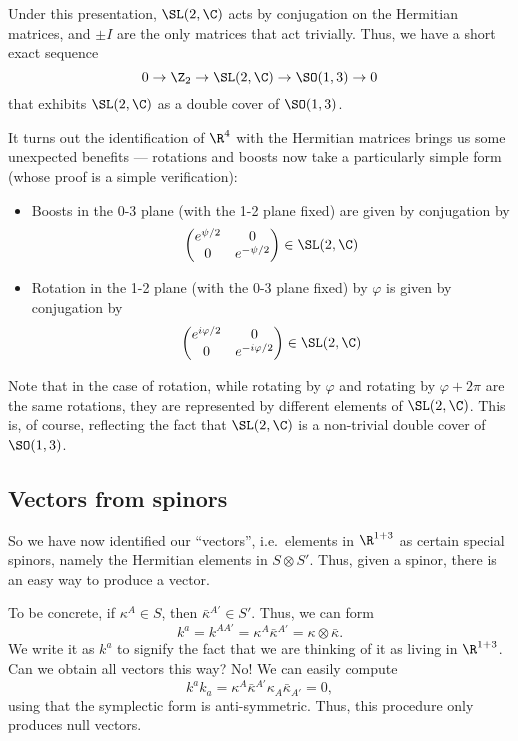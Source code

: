 \documentclass[a4paper]{article}
\begin{document}
Under this presentation, $\SL(2, \C)$ acts by conjugation on the Hermitian matrices, and $\pm I$ are the only matrices that act trivially. Thus, we have a short exact sequence
\[
  0 \to \Z_2 \to \SL(2, \C) \to \SO(1, 3) \to 0
\]
that exhibits $\SL(2, \C)$ as a double cover of $\SO(1, 3)$.

It turns out the identification of $\R^4$ with the Hermitian matrices brings us some unexpected benefits --- rotations and boosts now take a particularly simple form (whose proof is a simple verification):
\begin{prop}\leavevmode
  \begin{itemize}
    \item Boosts in the 0-3 plane (with the 1-2 plane fixed) are given by conjugation by
      \[
        \begin{pmatrix}
          e^{\psi/2} & 0\\
          0 & e^{-\psi/2}
        \end{pmatrix} \in \SL(2, \C)
      \]
    \item Rotation in the 1-2 plane (with the 0-3 plane fixed) by $\varphi$ is given by conjugation by
      \[
        \begin{pmatrix}
          e^{i\varphi/2} & 0\\
          0 & e^{-i\varphi/2}
        \end{pmatrix} \in \SL(2, \C)
      \]
  \end{itemize}
\end{prop}
Note that in the case of rotation, while rotating by $\varphi$ and rotating by $\varphi + 2\pi$ are the same rotations, they are represented by different elements of $\SL(2, \C)$. This is, of course, reflecting the fact that $\SL(2, \C)$ is a non-trivial double cover of $\SO(1, 3)$.

\subsection{Vectors from spinors}
So we have now identified our ``vectors'', i.e.\ elements in $\R^{1 + 3}$ as certain special spinors, namely the Hermitian elements in $S \otimes S'$. Thus, given a spinor, there is an easy way to produce a vector.

To be concrete, if $\kappa^A \in S$, then $\bar{\kappa}^{A'} \in S'$. Thus, we can form
\[
  k^a = k^{AA'} = \kappa^A \bar{\kappa}^{A'} = \kappa \otimes \bar{\kappa}.
\]
We write it as $k^a$ to signify the fact that we are thinking of it as living in $\R^{1 + 3}$. Can we obtain all vectors this way? No! We can easily compute
\[
  k^a k_a = \kappa^A \bar{\kappa}^{A'} \kappa_A \bar{\kappa}_{A'} = 0,
\]
using that the symplectic form is anti-symmetric. Thus, this procedure only produces null vectors.
\end{document}

